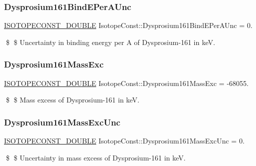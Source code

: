 \subsubsection{\texorpdfstring{Dysprosium161\+Bind\+E\+Per\+A\+Unc}{Dysprosium161BindEPerAUnc}}
{\footnotesize\ttfamily \mbox{\hyperlink{group___isotope_const-_macros_ga8f45a7272ce02c0b4c65c44636ed719a}{I\+S\+O\+T\+O\+P\+E\+C\+O\+N\+S\+T\+\_\+\+D\+O\+U\+B\+LE}} Isotope\+Const\+::\+Dysprosium161\+Bind\+E\+Per\+A\+Unc = 0.}

\$ \$ Uncertainty in binding energy per A of Dysprosium-\/161 in keV. \mbox{\label{group___isotope_const-_dysprosium-_dy161_ga55fbce20196ce4152d71db8317020fc2}} 
\subsubsection{\texorpdfstring{Dysprosium161\+Mass\+Exc}{Dysprosium161MassExc}}
{\footnotesize\ttfamily \mbox{\hyperlink{group___isotope_const-_macros_ga8f45a7272ce02c0b4c65c44636ed719a}{I\+S\+O\+T\+O\+P\+E\+C\+O\+N\+S\+T\+\_\+\+D\+O\+U\+B\+LE}} Isotope\+Const\+::\+Dysprosium161\+Mass\+Exc = -\/68055.}

\$ \$ Mass excess of Dysprosium-\/161 in keV. \mbox{\label{group___isotope_const-_dysprosium-_dy161_gaa171441ccdc8827a840296218b69f0a3}} 
\subsubsection{\texorpdfstring{Dysprosium161\+Mass\+Exc\+Unc}{Dysprosium161MassExcUnc}}
{\footnotesize\ttfamily \mbox{\hyperlink{group___isotope_const-_macros_ga8f45a7272ce02c0b4c65c44636ed719a}{I\+S\+O\+T\+O\+P\+E\+C\+O\+N\+S\+T\+\_\+\+D\+O\+U\+B\+LE}} Isotope\+Const\+::\+Dysprosium161\+Mass\+Exc\+Unc = 0.}

\$ \$ Uncertainty in mass excess of Dysprosium-\/161 in keV. \mbox{\label{group___isotope_const-_dysprosium-_dy161_gac6088c8fd7ad22872dad734f34c8c755}} 
